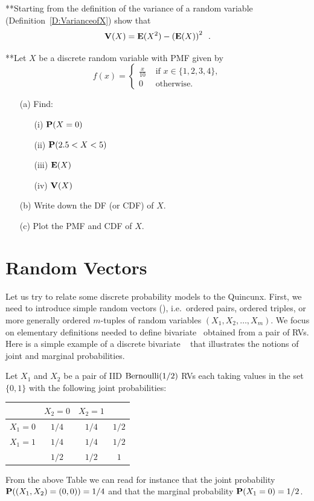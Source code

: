 \begin{ExerciseList}
\ee

\Exercise
{**}Starting from the definition of the variance of a random variable (Definition~\ref{D:VarianceofX}) show that
\[\mathbf{V}(X) = \mathbf{E}(X^2) - \left(\mathbf{E}(X)\right)^2 \enspace .\]

\Exercise
{**}Let $X$ be a discrete random variable with PMF given by
\[
f(x) = 
\begin{cases}
\frac{x}{10} & \text{ if } x \in \{1,2,3,4\} ,\\
0 & \text{ otherwise.}
\end{cases}
\]
\begin{itemize}
\item[(a)] Find:
\begin{itemize}
\item[(i)] $\mathbf{P}(X=0)$
\item[(ii)] $\mathbf{P}(2.5 < X < 5)$
\item[(iii)] $\mathbf{E}(X)$
\item[(iv)] $\mathbf{V}(X)$
\end{itemize}
\item[(b)] Write down the DF (or CDF) of $X$.
\item[(c)] Plot the PMF and CDF of $X$.
\end{itemize}

\Exercise


\end{ExerciseList}

\newpage

\section{Random Vectors}\label{S:RVecs}
Let us try to relate some discrete probability models to the Quincunx.  First, we need to introduce simple random vectors (\rv), i.e.~ordered pairs, ordered triples, or more generally ordered $m$-tuples of random variables $(X_1,X_2,\ldots,X_m)$.  We focus on elementary definitions needed to define bivariate \rv~obtained from a pair of RVs.  Here is a simple example of a discrete bivariate \rv~ that illustrates the notions of joint and marginal probabilities.

\begin{example}
Let $X_1$ and $X_2$ be a pair of IID $\mbox{{\rm Bernoulli}}(1/2)$ RVs each taking values in the set $\{0,1\}$ with the following joint probabilities:

\begin{center}
\begin{tabular}{|c|c c|c|}
\hline
& $X_2=0$ & $X_2=1$ & \\ \hline
$X_1=0$& $1/4$ & $1/4$ & $1/2$ \\
$X_1=1$& $1/4$ & $1/4$ & $1/2$ \\ \hline
& $1/2$ & $1/2$ & $1$\\ \hline
\end{tabular}
\end{center}
From the above Table we can read for instance that the joint probability $\mathbf{P}((X_1,X_2)=(0,0))=1/4$ and that the marginal probability $\mathbf{P}(X_1=0)=1/2$.
\end{example}

